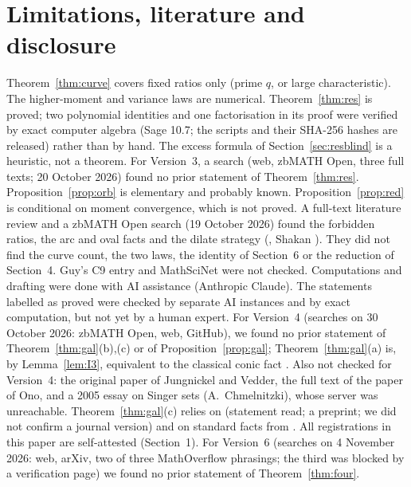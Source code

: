 \documentclass[11pt]{article}
\begin{document}
\section{Limitations, literature and disclosure}\label{sec:lim}
Theorem~\ref{thm:curve} covers fixed ratios only (prime $q$, or large characteristic). The higher-moment and variance laws are
numerical. Theorem~\ref{thm:res} is proved; two polynomial identities and one factorisation in its proof were verified by exact computer algebra (Sage 10.7; the scripts and their SHA-256 hashes are released) rather than by hand. The excess formula of Section~\ref{sec:resblind} is a heuristic, not a theorem. For Version~3, a search (web, zbMATH Open, three full texts; 20 October 2026) found no prior statement of Theorem~\ref{thm:res}. Proposition~\ref{prop:orb} is elementary and probably known. Proposition~\ref{prop:red} is conditional on moment convergence, which is not proved. A full-text literature review and a
zbMATH Open search (19 October 2026) found the forbidden ratios, the arc and oval facts \cite{JV,Pi} and the dilate strategy
(\cite{Go}, Shakan \cite{Sh}). They did not find the curve count, the two laws, the identity of Section~6 or the reduction of
Section~4. Guy's C9 entry and MathSciNet were not checked. Computations and drafting were done with AI assistance (Anthropic Claude).
The statements labelled as proved were checked by separate AI instances and by exact computation, but not yet by a human expert. For Version~4 (searches on 30 October 2026: zbMATH Open, web, GitHub), we found no prior statement of Theorem~\ref{thm:gal}(b),(c) or of Proposition~\ref{prop:gal}; Theorem~\ref{thm:gal}(a) is, by Lemma~\ref{lem:I3}, equivalent to the classical conic fact \cite{JV,Pi}. Also not checked for Version~4: the original paper of Jungnickel and Vedder, the full text of the paper of Ono, and a 2005 essay on Singer sets (A.~Chmelnitzki), whose server was unreachable. Theorem~\ref{thm:gal}(c) relies on \cite[Thm.~1.7]{BK} (statement read; a preprint; we did not confirm a journal version) and on standard facts from \cite{IR}. All registrations in this paper are self-attested (Section~1). For Version~6 (searches on 4 November 2026: web, arXiv, two of three MathOverflow phrasings; the third was blocked by a verification page) we found no prior statement of Theorem~\ref{thm:four}.
\end{document}
